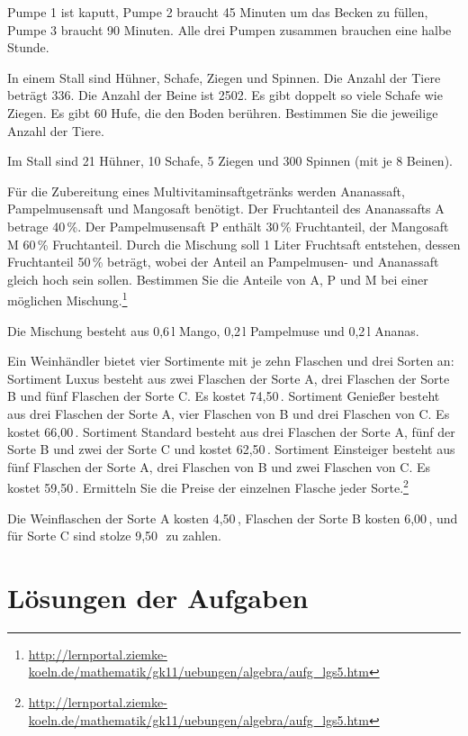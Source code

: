 \documentclass[12pt,a4paper,twoside,fleqn]{article}
\begin{document}
\begin{solution}
  Pumpe 1 ist kaputt, Pumpe 2 braucht 45 Minuten um das Becken zu
  füllen, Pumpe 3 braucht 90 Minuten. Alle drei Pumpen zusammen
  brauchen eine halbe Stunde.
\end{solution}
\begin{question}
  In einem Stall sind Hühner, Schafe, Ziegen und Spinnen.
  Die Anzahl der Tiere beträgt 336. Die Anzahl der Beine ist 2502. Es
  gibt doppelt so viele Schafe wie Ziegen. Es gibt 60 Hufe, die den
  Boden berühren. 
  Bestimmen Sie die jeweilige Anzahl der Tiere.
\end{question}
\begin{solution}
  Im Stall sind 21 Hühner, 10 Schafe, 5 Ziegen und 300 Spinnen (mit je 8 Beinen).
\end{solution}
\begin{question}
  Für die Zubereitung eines Multivitaminsaftgetränks werden
  Ananassaft, Pampelmusensaft und Mangosaft benötigt. Der Fruchtanteil
  des Ananassafts A betrage 40\,\%. Der Pampelmusensaft P enthält
  30\,\% Fruchtanteil, der Mangosaft M 60\,\% Fruchtanteil. Durch die
  Mischung soll 1 Liter Fruchtsaft entstehen, dessen Fruchtanteil
  50\,\% beträgt, wobei der Anteil an Pampelmusen- und Ananassaft
  gleich hoch sein sollen.
  Bestimmen Sie die Anteile von A, P und M bei einer
  möglichen Mischung.\footnote{ \url{http://lernportal.ziemke-koeln.de/mathematik/gk11/uebungen/algebra/aufg_lgs5.htm}}
\end{question}
\begin{solution}
  Die Mischung besteht aus 0,6\,l Mango, 0,2\,l Pampelmuse und 0,2\,l Ananas.
\end{solution}
\begin{question}
  Ein Weinhändler bietet vier Sortimente mit je zehn Flaschen und drei Sorten an:
Sortiment Luxus besteht aus zwei Flaschen der Sorte A, drei Flaschen
der Sorte B und fünf Flaschen der Sorte C. Es kostet 74,50\,\EUR . 
Sortiment Genießer besteht aus drei Flaschen der Sorte A, vier
Flaschen von B und drei Flaschen von C. Es kostet 66,00\,\EUR .
Sortiment Standard besteht aus drei Flaschen der Sorte A, fünf der
Sorte B und zwei der Sorte C und kostet 62,50\,\EUR .
Sortiment Einsteiger besteht aus fünf Flaschen der Sorte A, drei
Flaschen von B und zwei Flaschen von C. Es kostet 59,50\,\EUR .
Ermitteln Sie die Preise der einzelnen Flasche jeder Sorte.\footnote{\url{http://lernportal.ziemke-koeln.de/mathematik/gk11/uebungen/algebra/aufg_lgs5.htm}}

\end{question}
 \begin{solution}
  Die Weinflaschen der Sorte A kosten 4,50\,\EUR , Flaschen der Sorte
  B kosten 6,00\,\EUR , und für Sorte C sind stolze 9,50\,\EUR\ zu zahlen. 
 \end{solution}
\newpage
\section{Lösungen der Aufgaben}
{\scriptsize\printsolutions}
\end{document}

